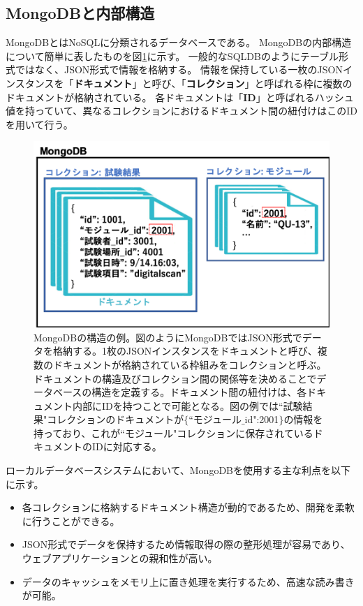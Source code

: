 
\clearpage
\subsection{MongoDBと内部構造}
MongoDBとはNoSQLに分類されるデータベースである。
MongoDBの内部構造\cite{4-2}について簡単に表したものを図\ref{mongodb_schema}に示す。
一般的なSQLDBのようにテーブル形式ではなく、JSON形式で情報を格納する。
情報を保持している一枚のJSONインスタンスを「\textbf{ドキュメント}」と呼び、「\textbf{コレクション}」と呼ばれる枠に複数のドキュメントが格納されている。
各ドキュメントは「\textbf{ID}」と呼ばれるハッシュ値を持っていて、異なるコレクションにおけるドキュメント間の紐付けはこのIDを用いて行う。

\begin{figure}[bpt]\centering
\includegraphics[width=12cm]{./mongodb_schema.png}
\caption[MongoDBの構造の例]{MongoDBの構造の例。図のようにMongoDBではJSON形式でデータを格納する。1枚のJSONインスタンスをドキュメントと呼び、複数のドキュメントが格納されている枠組みをコレクションと呼ぶ。ドキュメントの構造及びコレクション間の関係等を決めることでデータベースの構造を定義する。ドキュメント間の紐付けは、各ドキュメント内部にIDを持つことで可能となる。図の例では``試験結果"コレクションのドキュメントが$\{$``モジュール$\_$id":2001$\}$の情報を持っており、これが``モジュール"コレクションに保存されているドキュメントのIDに対応する。}
\label{mongodb_schema}
\end{figure}


ローカルデータベースシステムにおいて、MongoDBを使用する主な利点を以下に示す。

\begin{itemize}
  \item 各コレクションに格納するドキュメント構造が動的であるため、開発を柔軟に行うことができる。
  \item JSON形式でデータを保持するため情報取得の際の整形処理が容易であり、ウェブアプリケーションとの親和性が高い。
  \item データのキャッシュをメモリ上に置き処理を実行するため、高速な読み書きが可能\cite{4-8}。
\end{itemize}

